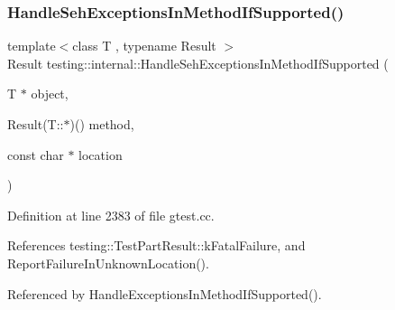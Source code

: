 \mbox{\label{namespacetesting_1_1internal_ac5293b438139ef7ed05cb7fcaaf63545}} 
\subsubsection{\texorpdfstring{Handle\+Seh\+Exceptions\+In\+Method\+If\+Supported()}{HandleSehExceptionsInMethodIfSupported()}}
{\footnotesize\ttfamily template$<$class T , typename Result $>$ \\
Result testing\+::internal\+::\+Handle\+Seh\+Exceptions\+In\+Method\+If\+Supported (\begin{DoxyParamCaption}\item[{T $\ast$}]{object,  }\item[{Result(T\+::$\ast$)()}]{method,  }\item[{const char $\ast$}]{location }\end{DoxyParamCaption})}



Definition at line 2383 of file gtest.\+cc.



References testing\+::\+Test\+Part\+Result\+::k\+Fatal\+Failure, and Report\+Failure\+In\+Unknown\+Location().



Referenced by Handle\+Exceptions\+In\+Method\+If\+Supported().


